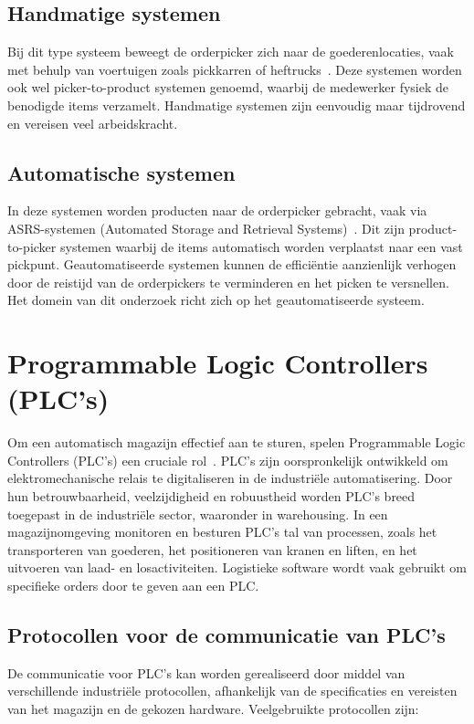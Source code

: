 \subsection{Handmatige systemen}
Bij dit type systeem beweegt de orderpicker zich naar de goederenlocaties, vaak met behulp van voertuigen zoals pickkarren of heftrucks~\autocite{Berg1999}. 
Deze systemen worden ook wel picker-to-product systemen genoemd, waarbij de medewerker fysiek de benodigde items verzamelt. 
Handmatige systemen zijn eenvoudig maar tijdrovend en vereisen veel arbeidskracht.

\subsection{Automatische systemen}
In deze systemen worden producten naar de orderpicker gebracht, vaak via ASRS-systemen (Automated Storage and Retrieval Systems)~\autocite{Berg1999}. 
Dit zijn product-to-picker systemen waarbij de items automatisch worden verplaatst naar een vast pickpunt. 
Geautomatiseerde systemen kunnen de efficiëntie aanzienlijk verhogen door de reistijd van de orderpickers te verminderen 
en het picken te versnellen.
Het domein van dit onderzoek richt zich op het geautomatiseerde systeem. 

\section{Programmable Logic Controllers (PLC’s)}
Om een automatisch magazijn effectief aan te sturen, spelen Programmable Logic Controllers (PLC's) een cruciale rol~\autocite{Bolton2015}.
PLC's zijn oorspronkelijk ontwikkeld om elektromechanische relais te digitaliseren in de industriële automatisering. 
Door hun betrouwbaarheid, veelzijdigheid en robuustheid worden PLC’s breed toegepast in de industriële sector, waaronder in warehousing. 
In een magazijnomgeving monitoren en besturen PLC's tal van processen, zoals het transporteren van goederen, 
het positioneren van kranen en liften, en het uitvoeren van laad- en losactiviteiten.
Logistieke software wordt vaak gebruikt om specifieke orders door te geven aan een PLC.

\subsection{Protocollen voor de communicatie van PLC's} 
De communicatie voor PLC’s kan worden gerealiseerd door middel van verschillende industriële protocollen, 
afhankelijk van de specificaties en vereisten van het magazijn en de gekozen hardware. 
Veelgebruikte protocollen zijn:

